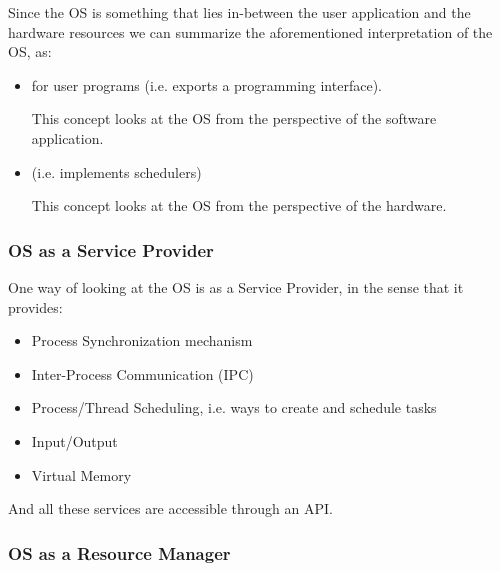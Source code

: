 Since the OS is something that lies in-between the user application and the hardware resources we can summarize the aforementioned interpretation of the OS, as:
\begin{itemize}
\item {} for user programs (i.e. exports a programming interface).

This concept looks at the OS from the perspective of the software application.
\item {} (i.e. implements schedulers)

This concept looks at the OS from the perspective of the hardware.
\end{itemize}

\subsubsection{OS as a Service Provider}
One way of looking at the OS is as a Service Provider, in the sense that it provides:
\begin{itemize}
\item Process Synchronization mechanism
\item Inter-Process Communication (IPC)
\item Process/Thread Scheduling, i.e.  ways to create and schedule tasks
\item Input/Output
\item Virtual Memory
\end{itemize}
And all these services are accessible through an API.
\subsubsection{OS as a Resource Manager}

